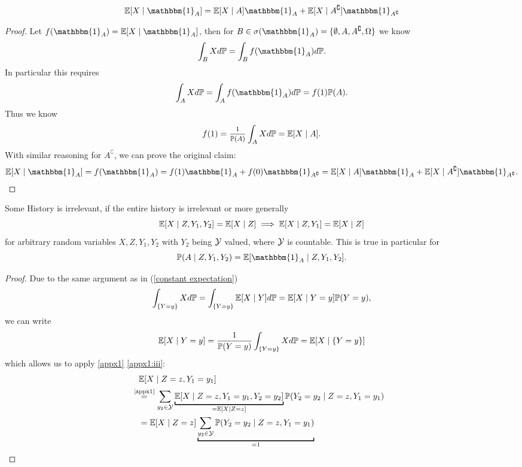 \begin{lemma}\label{appx:6}
    \begin{align*}
        \E[X\mid \mathbbm{1}_A]=\E[X\mid A]\mathbbm{1}_A +\E[X\mid A^\complement]\mathbbm{1}_{A^\complement}
    \end{align*}
\end{lemma}
\begin{proof}
    Let \(f(\mathbbm{1}_A)=\E[X\mid \mathbbm{1}_A]\), then for \(B\in\sigma(\mathbbm{1}_A)=\{\emptyset,A,A^\complement,\Omega\}\) we know
    \[
        \int_B X d\Pr =\int_B f(\mathbbm{1}_A)d\Pr.
    \]
    In particular this requires
    \begin{align}\label{constant expectation}
        \int_A X d\Pr = \int_A f(\mathbbm{1}_A)d\Pr = f(1) \Pr(A).
    \end{align}
    Thus we know
    \[
        f(1)=\mfrac{1}{\Pr(A)}\int_A X d\Pr=\E[X\mid A].
    \]
    With similar reasoning for \(A^\complement\), we can prove the original claim:
    \begin{align*}
        \E[X\mid \mathbbm{1}_A]=f(\mathbbm{1}_A)=f(1)\mathbbm{1}_A + f(0)\mathbbm{1}_{A^\complement}=\E[X\mid A]\mathbbm{1}_A +\E[X\mid A^\complement]\mathbbm{1}_{A^\complement}.
    \end{align*}
\end{proof}
\begin{lemma}\label{appx7}
    Some History is irrelevant, if the entire history is irrelevant or more generally
    \[
        \mathbb{E}[X\mid Z, Y_1,Y_2]=\mathbb{E}[X\mid Z] \implies \mathbb{E}[X\mid Z, Y_1]=\mathbb{E}[X\mid Z]
    \]
    for arbitrary random variables \(X, Z, Y_1, Y_2\) with \(Y_2\) being \(\mathcal{Y}\) valued, where \(\mathcal{Y}\) is countable. This is true in particular for
    \[
        \Pr(A\mid Z, Y_1,Y_2)=\E[\mathbbm{1}_A \mid Z, Y_1,Y_2].
    \]
\end{lemma}
\begin{proof} Due to the same argument as in (\ref{constant expectation})
    \[
        \int_{\{Y=y\}} X d\mathbb{P} = \int_{\{Y=y\}} \mathbb{E}[X\mid Y]d\mathbb{P} = \mathbb{E}[X\mid Y=y] \mathbb{P}(Y=y),
    \]
    we can write
    \[
        \mathbb{E}[X\mid Y=y]=\frac{1}{\mathbb{P}(Y=y)}\int_{\{Y=y\}} X d\mathbb{P}=\mathbb{E}[X \mid \{Y=y\}]
    \]
    which allows us to apply \ref{appx1} \ref{appx1:iii}:
    \begin{align*}
        &\E[X\mid Z=z, Y_1=y_1]\\
        &\lxeq{\text{\ref{appx1}}}\sum_{y_2\in\cY} \underbracket[1pt]{\E[X\mid Z=z, Y_1=y_1, Y_2=y_2]}_{=\E[X\mid Z=z]} \Pr(Y_2=y_2\mid Z=z,Y_1=y_1)\\
        &=\E[X\mid Z=z] \underbracket[1pt]{\sum_{y_2\in\cY} \Pr(Y_2=y_2\mid Z=z,Y_1=y_1)}_{=1}\qedhere
    \end{align*}
\end{proof}

